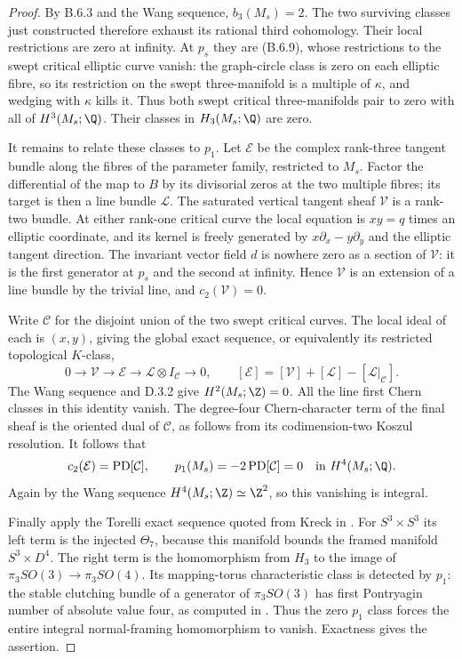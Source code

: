 \begin{proof}
By B.6.3 and the Wang sequence, $b_3(M_s)=2$. The two surviving
classes just constructed therefore exhaust its rational third
cohomology. Their local restrictions are zero at infinity. At
$p_s$ they are (B.6.9), whose restrictions to the swept critical
elliptic curve vanish: the graph-circle class is zero on each
elliptic fibre, so its restriction on the swept three-manifold is
a multiple of $\kappa$, and wedging with $\kappa$ kills it.
Thus both swept critical three-manifolds pair to zero with all of
$H^3(M_s;\Q)$. Their classes in $H_3(M_s;\Q)$ are zero.

It remains to relate these classes to $p_1$. Let $\mathcal E$ be
the complex rank-three tangent bundle along the fibres of the
parameter family, restricted to $M_s$. Factor the differential
of the map to $B$ by its divisorial zeros at the two multiple
fibres; its target is then a line bundle $\mathcal L$. The
saturated vertical tangent sheaf $\mathcal V$ is a rank-two
bundle. At either rank-one critical curve the local equation is
$xy=q$ times an elliptic coordinate, and its kernel is freely
generated by
$x\partial_x-y\partial_y$ and the elliptic tangent direction.
The invariant vector field $d$ is nowhere zero as a section of
$\mathcal V$: it is the first generator at $p_s$ and the second
at infinity. Hence $\mathcal V$ is an extension of a line bundle
by the trivial line, and $c_2(\mathcal V)=0$.

Write $\mathcal C$ for the disjoint union of the two swept critical
curves. The local ideal of each is $(x,y)$, giving the global
exact sequence, or equivalently its restricted topological $K$-class,
\[
 0\longrightarrow\mathcal V\longrightarrow\mathcal E
 \longrightarrow\mathcal L\otimes I_{\mathcal C}\longrightarrow0,
 \qquad
 [\mathcal E]=[\mathcal V]+[\mathcal L]-[\mathcal L|_{\mathcal C}].
\]
The Wang sequence and D.3.2 give $H^2(M_s;\Z)=0$. All the line
first Chern classes in this identity vanish. The degree-four
Chern-character term of the final sheaf is the oriented dual of
$\mathcal C$, as follows from its codimension-two Koszul resolution.
It follows that
\[
 c_2(\mathcal E)=\operatorname{PD}[\mathcal C],\qquad
 p_1(M_s)=-2\operatorname{PD}[\mathcal C]=0
       \quad\hbox{in }H^4(M_s;\Q).
\]
Again by the Wang sequence $H^4(M_s;\Z)\simeq\Z^2$, so this
vanishing is integral.

Finally apply the Torelli exact sequence quoted from Kreck in
\cite[Section 2.1, equation (2)]{mapsKrylov03}. For $S^3\times S^3$
its left term is the injected $\Theta_7$, because this manifold
bounds the framed manifold $S^3\times D^4$. The right term is
the homomorphism from $H_3$ to the image of
$\pi_3SO(3)\to\pi_3SO(4)$. Its mapping-torus characteristic class
is detected by $p_1$: the stable clutching bundle of a generator
of $\pi_3SO(3)$ has first Pontryagin number of absolute value four,
as computed in \cite[proof of Theorem 2]{mapsKrylov03}. Thus the
zero $p_1$ class forces the entire integral normal-framing
homomorphism to vanish. Exactness gives the assertion.
\end{proof}

